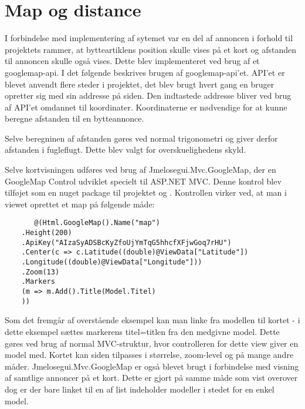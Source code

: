 \section{Map og distance}
I forbindelse med implementering af sytemet var en del af annoncen i forhold til projektets rammer, at bytteartiklens position skulle vises på et kort og afstanden til annoncen skulle også vises. Dette blev implementeret ved brug af et googlemap-api.
I det følgende beskrives brugen af googlemap-api'et. API'et er blevet anvendt flere steder i projektet, det blev brugt hvert gang en bruger opretter sig med sin addresse på siden. Den indtastede addresse bliver ved brug af API'et omdannet til koordinater. Koordinaterne er nødvendige for at kunne beregne afstanden til en bytteannonce.

Selve beregninen af afstanden gøres ved normal trigonometri og giver derfor afstanden i fugleflugt. Dette blev valgt for overskuelighedens skyld. 

Selve kortvisningen udføres ved brug af Jmelosegui.Mvc.GoogleMap, der en GoogleMap Control udviklet specielt til ASP.NET MVC. Denne kontrol blev tilføjet som en nuget package til projektet og . Kontrollen virker ved, at man i viewet oprettet et map på følgende måde:
\begin{verbatim}
	   @(Html.GoogleMap().Name("map")
	.Height(200)
	.ApiKey("AIzaSyADSBcKyZfoUjYmTqG5hhcfXFjwGoq7rHU")
	.Center(c => c.Latitude((double)@ViewData["Latitude"])
	.Longitude((double)@ViewData["Longitude"]))
	.Zoom(13)
	.Markers
	(m => m.Add().Title(Model.Titel)
	))
\end{verbatim}

Som det fremgår af overstående eksempel kan man linke fra modellen til kortet - i dette eksempel sættes markerens titel=titlen fra den medgivne model. Dette gøres ved brug af normal MVC-struktur, hvor controlleren for dette view giver en model med. Kortet kan siden tilpasses i størrelse, zoom-level og på mange andre måder.
Jmelosegui.Mvc.GoogleMap er også blevet brugt i forbindelse med visning af samtlige annoncer på et kort. Dette er gjort på samme måde som vist overover dog er der bare linket til en af list indeholder modeller i stedet for en enkel model.

